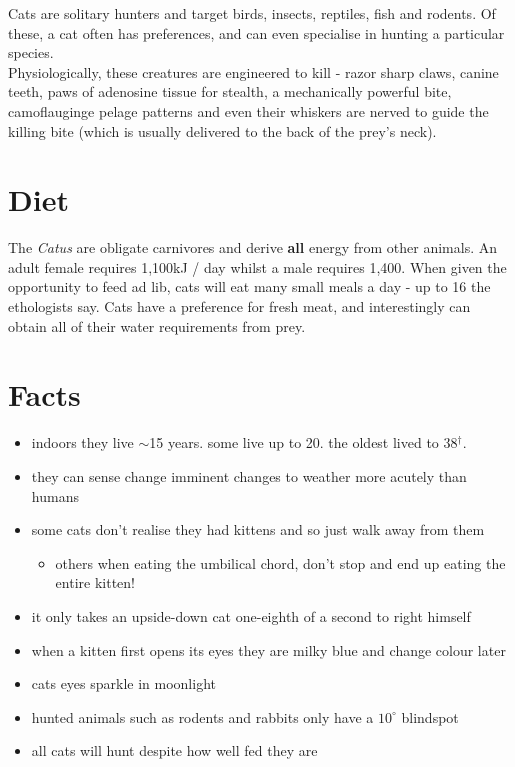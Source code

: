 \documentclass{article}
\begin{document}
\noindent{}Cats are solitary hunters and target birds, insects, reptiles, fish and rodents. Of these, a cat often has preferences, and can even specialise in hunting a particular species.\\

Physiologically, these creatures are engineered to kill - razor sharp claws, canine teeth, paws of adenosine tissue for stealth, a mechanically powerful bite, camoflauginge \gls{pelage} patterns and even their whiskers are nerved to guide the killing bite (which is usually delivered to the back of the prey's neck).


\section*{Diet}
The \emph{Catus} are obligate carnivores and derive \textbf{all} energy from other animals. An adult female requires 1,100kJ / day whilst a male requires 1,400. When given the opportunity to feed ad lib, cats will eat many small meals a day - up to 16 the \gls{ethologist}s say. Cats have a preference for fresh meat, and interestingly can obtain all of their water requirements from prey. 


\section*{Facts}
\begin{itemize}
    \item indoors they live $\sim$15 years. some live up to 20. the oldest lived to 38$^\dagger$.
    \item they can sense change imminent changes to weather more acutely than humans
    \item some cats don't realise they had kittens and so just walk away from them
        \begin{itemize}
            \item others when eating the umbilical chord, don't stop and end up eating the entire kitten!
        \end{itemize}
    \item it only takes an upside-down cat one-eighth of a second to right himself
    \item when a kitten first opens its eyes they are milky blue and change colour later
    \item cats eyes sparkle in moonlight
    \item hunted animals such as rodents and rabbits only have a \(10^\circ\) blindspot
    \item all cats will hunt despite how well fed they are
\end{itemize}
\end{document}
